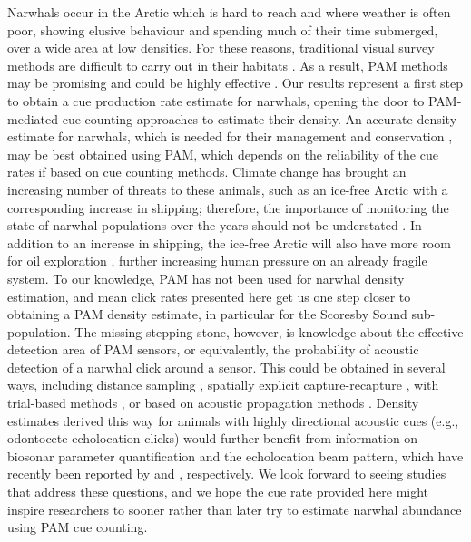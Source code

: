 \documentclass[preprint]{JASA}
\begin{document}
Narwhals occur in the Arctic which is hard to reach and where weather is often poor, showing elusive behaviour and spending much of their time submerged, over a wide area at low densities. For these reasons, traditional visual survey methods are difficult to carry out in their habitats \citep{Marques_2009}. As a result, PAM methods may be promising and could be highly effective \citep{Marques_2009}. Our results represent a first step to obtain a cue production rate estimate for narwhals, opening the door to PAM-mediated cue counting approaches to estimate their density. An accurate density estimate for narwhals, which is needed for their management and conservation \citep{Podolskiy_2020}, may be best obtained using PAM, which depends on the reliability of the cue rates if based on cue counting methods. Climate change has brought an increasing number of threats to these animals, such as an ice-free Arctic with a corresponding increase in shipping; therefore, the importance of monitoring the state of narwhal populations over the years should not be understated \citep{Podolskiy_2020, shuert2022decadal}. In addition to an increase in shipping, the ice-free Arctic will also have more room for oil exploration \citep{williams2022physiological}, further increasing human pressure on an already fragile system. To our knowledge, PAM has not been used for narwhal density estimation, and mean click rates presented here get us one step closer to obtaining a PAM density estimate, in particular for the Scoresby Sound sub-population. The missing stepping stone, however, is knowledge about the effective detection area of PAM sensors, or equivalently, the probability of acoustic detection of a narwhal click around a sensor. This could be obtained in several ways, including distance sampling \cite[e.g.][]{Marques_2011}, spatially explicit capture-recapture \citep[e.g.][]{ stevenson2021spatial}, with trial-based methods \citep[e.g.][]{Marques_2009}, or based on acoustic propagation methods \citep[e.g.][]{K_sel_2011}. Density estimates derived this way for animals with highly directional acoustic cues (e.g., odontocete echolocation clicks) would further benefit from information on biosonar parameter quantification and the echolocation beam pattern, which have recently been reported by \citet{zahn2021acoustic} and \citet{Koblitz_2016}, respectively. We look forward to seeing studies that address these questions, and we hope the cue rate provided here might inspire researchers to sooner rather than later try to estimate narwhal abundance using PAM cue counting.
\end{document}
